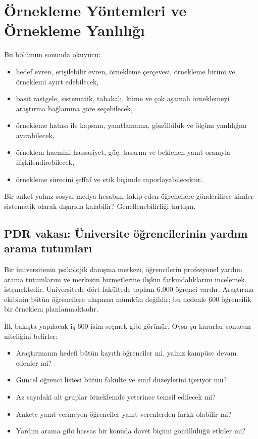 \chapter{Örnekleme Yöntemleri ve Örnekleme Yanlılığı}
\label{ch:sampling-design}

\begin{hedefler}
Bu bölümün sonunda okuyucu:
\begin{itemize}
  \item hedef evren, erişilebilir evren, örnekleme çerçevesi, örnekleme birimi ve örneklemi ayırt edebilecek,
  \item basit rastgele, sistematik, tabakalı, küme ve çok aşamalı örneklemeyi araştırma bağlamına göre seçebilecek,
  \item örnekleme hatası ile kapsam, yanıtlamama, gönüllülük ve ölçüm yanlılığını ayırabilecek,
  \item örneklem hacmini hassasiyet, güç, tasarım ve beklenen yanıt oranıyla ilişkilendirebilecek,
  \item örnekleme sürecini şeffaf ve etik biçimde raporlayabilecektir.
\end{itemize}
\end{hedefler}

\begin{hazirlik}
Bir anket yalnız sosyal medya hesabını takip eden öğrencilere gönderilirse
kimler sistematik olarak dışarıda kalabilir? Genellenebilirliği tartışın.
\end{hazirlik}

\section{PDR vakası: Üniversite öğrencilerinin yardım arama tutumları}

Bir üniversitenin psikolojik danışma merkezi, öğrencilerin profesyonel yardım
arama tutumlarını ve merkezin hizmetlerine ilişkin farkındalıklarını
incelemek istemektedir. Üniversitede dört fakültede toplam 6.000 öğrenci
vardır. Araştırma ekibinin bütün öğrencilere ulaşması mümkün değildir; bu
nedenle 600 öğrencilik bir örneklem planlanmaktadır.

İlk bakışta yapılacak iş 600 isim seçmek gibi görünür. Oysa şu kararlar
sonucun niteliğini belirler:

\begin{itemize}
  \item Araştırmanın hedefi bütün kayıtlı öğrenciler mi, yalnız kampüse devam edenler mi?
  \item Güncel öğrenci listesi bütün fakülte ve sınıf düzeylerini içeriyor mu?
  \item Az sayıdaki alt gruplar örneklemde yeterince temsil edilecek mi?
  \item Ankete yanıt vermeyen öğrenciler yanıt verenlerden farklı olabilir mi?
  \item Yardım arama gibi hassas bir konuda davet biçimi gönüllülüğü etkiler mi?
\end{itemize}

